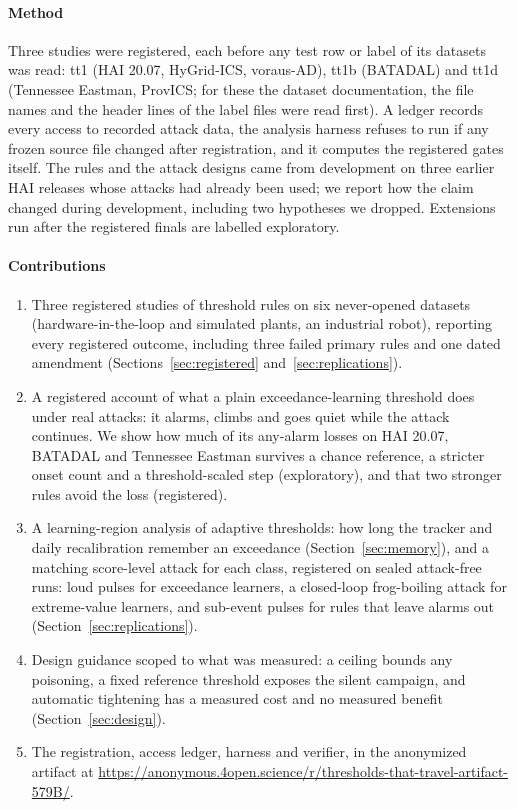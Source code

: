 \documentclass[letterpaper,twocolumn,10pt]{article}
\begin{document}
\paragraph{Method}
Three studies were registered, each before any test row or label of its datasets was read: tt1 (HAI
20.07, HyGrid-ICS, voraus-AD), tt1b (BATADAL) and tt1d (Tennessee Eastman, ProvICS; for these the
dataset documentation, the file names and the header lines of the label files were read first). A ledger records every access to recorded attack data, the analysis harness refuses to
run if any frozen source file changed after registration, and it computes the registered gates
itself. The rules and the attack designs came from development on three earlier HAI releases whose
attacks had already been used; we report how the claim changed during development, including two
hypotheses we dropped. Extensions run after the registered finals are labelled exploratory.

\paragraph{Contributions}
\begin{enumerate}
\item Three registered studies of threshold rules on six never-opened datasets (hardware-in-the-loop
  and simulated plants, an industrial robot), reporting every registered outcome, including three
  failed primary rules and one dated amendment
  (Sections~\ref{sec:registered} and~\ref{sec:replications}).
\item A registered account of what a plain exceedance-learning threshold does under real attacks: it
  alarms, climbs and goes quiet while the attack continues. We show how much of its any-alarm losses
  on HAI 20.07, BATADAL and Tennessee Eastman survives a chance reference, a stricter onset count and a
  threshold-scaled step (exploratory), and that two stronger rules avoid the loss (registered).
\item A learning-region analysis of adaptive thresholds: how long the tracker and daily
  recalibration remember an exceedance (Section~\ref{sec:memory}), and a matching score-level attack
  for each class, registered on sealed attack-free runs: loud pulses for exceedance learners, a
  closed-loop frog-boiling attack for extreme-value learners, and sub-event pulses for rules that leave
  alarms out (Section~\ref{sec:replications}).
\item Design guidance scoped to what was measured: a ceiling bounds any poisoning, a fixed reference
  threshold exposes the silent campaign, and automatic tightening has a measured cost and no measured
  benefit (Section~\ref{sec:design}).
\item The registration, access ledger, harness and verifier, in the anonymized artifact at
  \url{https://anonymous.4open.science/r/thresholds-that-travel-artifact-579B/}.
\end{enumerate}
\end{document}
